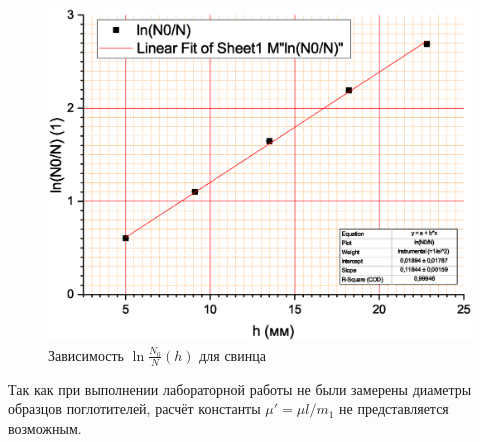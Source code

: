 \documentclass[a4paper]{article}
\begin{document}
\begin{figure}
	\centering
	\includegraphics[width=1.0\linewidth]{Pb}
	\caption{Зависимость $\ln \frac{N_0}{N} (h)$ для свинца}
	\label{fig:pb}
\end{figure}

Так как при выполнении лабораторной работы не были замерены диаметры образцов поглотителей, расчёт константы $ \mu' = \mu l /m_1 $ не представляется возможным.
\end{document}
